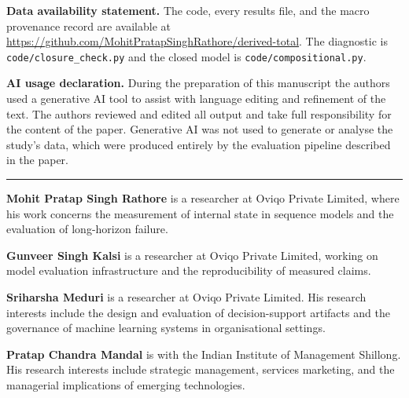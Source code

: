 \documentclass[11pt]{article}
\begin{document}
\vspace{0.6em}
\noindent\textbf{Data availability statement.} The code, every results file, and the
macro provenance record are available at
\url{https://github.com/MohitPratapSinghRathore/derived-total}. The diagnostic is
\texttt{code/closure\_check.py} and the closed model is
\texttt{code/compositional.py}.

\vspace{0.6em}
\noindent\textbf{AI usage declaration.} During the preparation of this manuscript
the authors used a generative AI tool to assist with language editing and refinement
of the text. The authors reviewed and edited all output and take full responsibility
for the content of the paper. Generative AI was not used to generate or analyse the
study's data, which were produced entirely by the evaluation pipeline described in
the paper.

\vspace{2em}
\noindent\rule{\linewidth}{0.4pt}

\vspace{1em}

\vspace{0.8em}
\noindent\textbf{Mohit Pratap Singh Rathore} is a researcher at Oviqo Private
Limited, where his work concerns the measurement of internal state in sequence
models and the evaluation of long-horizon failure.

\vspace{0.6em}
\noindent\textbf{Gunveer Singh Kalsi} is a researcher at Oviqo Private Limited,
working on model evaluation infrastructure and the reproducibility of measured
claims.

\vspace{0.6em}
\noindent\textbf{Sriharsha Meduri} is a researcher at Oviqo Private Limited. His
research interests include the design and evaluation of decision-support artifacts
and the governance of machine learning systems in organisational settings.

\vspace{0.6em}
\noindent\textbf{Pratap Chandra Mandal} is with the Indian Institute of Management
Shillong. His research interests include strategic management, services marketing,
and the managerial implications of emerging technologies.
\end{document}
